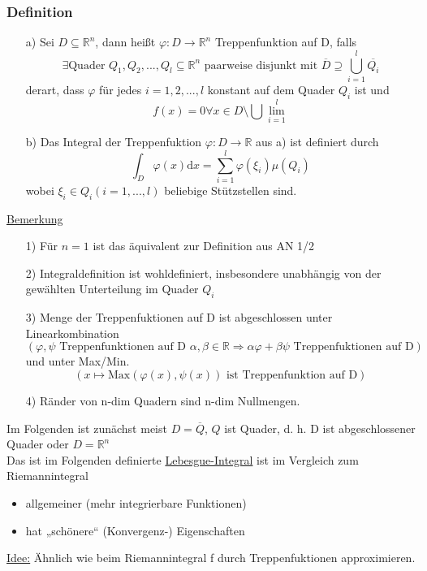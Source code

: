\subsubsection{Definition}
\begin{itemize}
	\item[a)] Sei $D \subseteq \mathbb{R}^n$, dann heißt $\varphi :D \to \mathbb{R}^n$ Treppenfunktion auf D, falls
		\[ \exists \text{Quader } Q_1, Q_2, ..., Q_l \subseteq \mathbb{R}^n \text{ paarweise disjunkt mit } \overline{D} \supseteq \bigcup_{i=1}^l \overline{Q_i}\]
		derart, dass $\varphi$ für jedes $i = 1,2,...,l$ konstant auf dem Quader $Q_i$ ist und \[f(x) = 0 \forall x \in D\setminus \bigcup\lim_{i=1}^l\]
	\item[b)] Das Integral der Treppenfuktion $\varphi\colon D \to \mathbb{R}$ aus a) ist definiert durch
		\[ \int_D \varphi(x) \text{d}x = \sum_{i=1}^l \varphi(\xi_i) \mu(Q_i)\]
		wobei $\xi_i \in Q_i (i=1,...,l)$ beliebige Stützstellen sind. 
\end{itemize}

\underline{Bemerkung}
\begin{itemize}
	\item[1)] Für $n=1$ ist das äquivalent zur Definition aus AN 1/2
	\item[2)] Integraldefinition ist wohldefiniert, insbesondere unabhängig von der gewählten Unterteilung im Quader $Q_i$
	\item[3)] Menge der Treppenfuktionen auf D ist abgeschlossen unter Linearkombination
	\[(\varphi, \psi \text{ Treppenfunktionen auf D } \alpha, \beta \in \mathbb{R} \Rightarrow \alpha\varphi + \beta\psi \text{ Treppenfuktionen auf D})\]
	und unter Max/Min.
	\[(x \mapsto \text{Max} (\varphi(x), \psi(x)) \text{ ist Treppenfunktion auf D})\]
	\item[4)] Ränder von n-dim Quadern sind n-dim Nullmengen.
\end{itemize}
Im Folgenden ist zunächst meist $D=\overline{Q}$, $Q$ ist Quader, d. h. D ist abgeschlossener Quader oder $D=\mathbb{R}^n$\\
Das ist im Folgenden definierte \underline{Lebesgue-Integral} ist im Vergleich zum Riemannintegral
\begin{itemize}
	\item allgemeiner (mehr integrierbare Funktionen)
	\item hat „schönere“ (Konvergenz-) Eigenschaften
\end{itemize}

\underline{Idee:} Ähnlich wie beim Riemannintegral f durch Treppenfuktionen approximieren.\\

